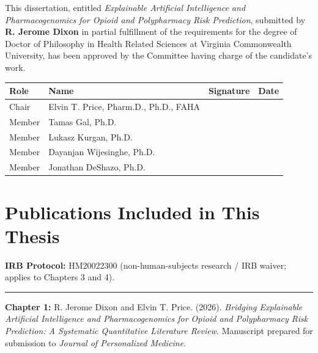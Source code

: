 \documentclass[
  12pt,
]{book}
\begin{document}
This dissertation, entitled \emph{Explainable Artificial Intelligence
and Pharmacogenomics for Opioid and Polypharmacy Risk Prediction},
submitted by \textbf{R. Jerome Dixon} in partial fulfillment of the
requirements for the degree of Doctor of Philosophy in Health Related
Sciences at Virginia Commonwealth University, has been approved by the
Committee having charge of the candidate's work.

\begin{longtable}[]{@{}llll@{}}
\toprule\noalign{}
Role & Name & Signature & Date \\
\midrule\noalign{}
\endhead
\bottomrule\noalign{}
\endlastfoot
Chair & Elvin T. Price, Pharm.D., Ph.D., FAHA & & \\
Member & Tamas Gal, Ph.D. & & \\
Member & Lukasz Kurgan, Ph.D. & & \\
Member & Dayanjan Wijesinghe, Ph.D. & & \\
Member & Jonathan DeShazo, Ph.D. & & \\
\end{longtable}

\newpage

\chapter*{Publications Included in This
Thesis}\label{publications-included-in-this-thesis}

\textbf{IRB Protocol:} HM20022300 (non-human-subjects research / IRB
waiver; applies to Chapters 3 and 4).

\begin{center}\rule{0.5\linewidth}{0.5pt}\end{center}

\textbf{Chapter 1:} R. Jerome Dixon and Elvin T. Price. (2026).
\emph{Bridging Explainable Artificial Intelligence and Pharmacogenomics
for Opioid and Polypharmacy Risk Prediction: A Systematic Quantitative
Literature Review}. Manuscript prepared for submission to \emph{Journal
of Personalized Medicine}.
\end{document}
